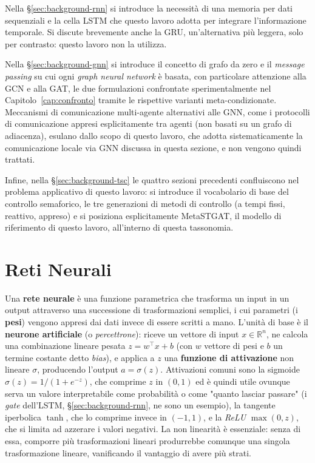 Nella §\ref{sec:background-rnn} si introduce la necessità di una memoria
per dati sequenziali e la cella LSTM che questo lavoro adotta per
integrare l'informazione temporale. Si discute brevemente anche la GRU,
un'alternativa più leggera, solo per contrasto: questo lavoro non la
utilizza.

Nella §\ref{sec:background-gnn} si introduce il concetto di grafo da zero
e il \emph{message passing} su cui ogni \emph{graph neural network} è
basata, con particolare attenzione alla GCN e alla GAT, le due
formulazioni confrontate sperimentalmente nel Capitolo~\ref{cap:confronto}
tramite le rispettive varianti meta-condizionate. Meccanismi di
comunicazione multi-agente alternativi alle GNN, come i protocolli di
comunicazione appresi esplicitamente tra agenti (non basati su un grafo di
adiacenza), esulano dallo scopo di questo lavoro, che adotta
sistematicamente la comunicazione locale via GNN discussa in questa
sezione, e non vengono quindi trattati.

Infine, nella §\ref{sec:background-tsc} le quattro sezioni precedenti
confluiscono nel problema applicativo di questo lavoro: si introduce il
vocabolario di base del controllo semaforico, le tre generazioni di
metodi di controllo (a tempi fissi, reattivo, appreso) e si posiziona
esplicitamente MetaSTGAT, il modello di riferimento di questo lavoro,
all'interno di questa tassonomia.

\section{Reti Neurali}
\label{sec:background-nn}

Una \textbf{rete neurale} è una funzione parametrica che trasforma un
input in un output attraverso una successione di trasformazioni semplici,
i cui parametri (i \textbf{pesi}) vengono appresi dai dati invece di
essere scritti a mano. L'unità di base è il \textbf{neurone artificiale}
(o \emph{percettrone}): riceve un vettore di input $x \in \mathbb{R}^n$,
ne calcola una combinazione lineare pesata $z = w^\top x + b$ (con $w$
vettore di pesi e $b$ un termine costante detto \emph{bias}), e applica a
$z$ una \textbf{funzione di attivazione} non lineare $\sigma$, producendo
l'output $a=\sigma(z)$. Attivazioni comuni sono la sigmoide $\sigma(z) =
1/(1+e^{-z})$, che comprime $z$ in $(0,1)$ ed è quindi utile ovunque serva
un valore interpretabile come probabilità o come "quanto lasciar passare"
(i \emph{gate} dell'LSTM, §\ref{sec:background-rnn}, ne sono un esempio),
la tangente iperbolica $\tanh$, che lo comprime invece in $(-1,1)$, e la
\emph{ReLU} $\max(0,z)$, che si limita ad azzerare i valori negativi. La
non linearità è essenziale: senza di essa, comporre più trasformazioni
lineari produrrebbe comunque una singola trasformazione lineare, vanificando
il vantaggio di avere più strati.


